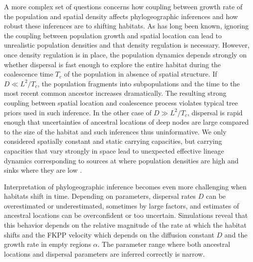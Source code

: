 \documentclass[aps,rmp, twocolumn]{revtex4}
\begin{document}
A more complex set of questions concerns how coupling between growth rate of the population and spatial density affects phylogeographic inferences and how robust these inferences are to shifting habitats.
As has long been known, ignoring the coupling between population growth and spatial location can lead to unrealistic population densities \citep{felsenstein_pain_1975} and that density regulation is necessary.
However, once density regulation is in place, the population dynamics depends strongly on whether dispersal is fast enough to explore the entire habitat during the coalescence time $T_c$ of the population in absence of spatial structure.
If $D\ll L^2/T_c$, the population fragments into subpopulations and the time to the most recent common ancestor increases dramatically.
The resulting strong coupling between spatial location and coalescence process violates typical tree priors used in such inference.
In the other case of $D\gg L^2/T_c$, dispersal is rapid enough that uncertainties of ancestral locations of deep nodes are large compared to the size of the habitat and such inferences thus uninformative.
We only considered spatially constant and static carrying capacities, but carrying capacities that vary strongly in space lead to unexpected effective lineage dynamics corresponding to sources at where population densities are high and sinks where they are low \citep{wilkins_coalescent_2002}.

Interpretation of phylogeographic inference becomes even more challenging when habitats shift in time.
Depending on parameters, dispersal rates $D$ can be overestimated or underestimated, sometimes by large factors, and estimates of ancestral locations can be overconfident or too uncertain.
Simulations reveal that this behavior depends on the relative magnitude of the rate at which the habitat shifts and the FKPP velocity which depends on the diffusion constant $D$ and the growth rate in empty regions $\alpha$.
The parameter range where both ancestral locations and dispersal parameters are inferred correctly is narrow.
\end{document}
